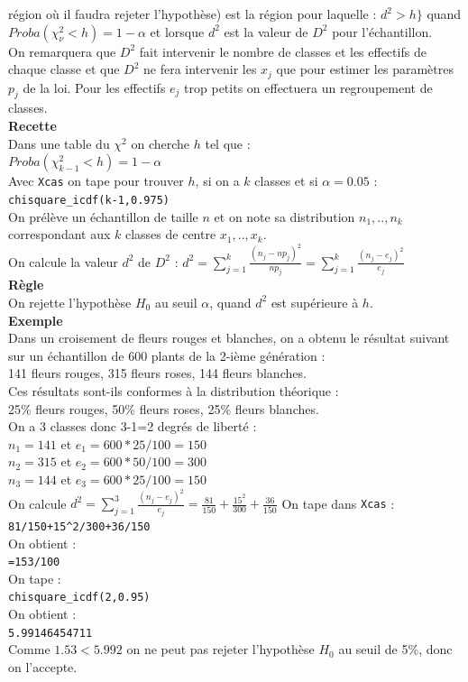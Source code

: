 \documentclass[a4paper,11pt]{book}
\begin{document}
r\'egion o\`u il faudra rejeter l'hypoth\`ese) est la r\'egion pour laquelle :
$d^2>h\}$ quand $Proba(\chi^2_\nu<h)=1-\alpha$ et
lorsque  $d^2$ est la valeur de $D^2$ pour l'\'echantillon.\\
On remarquera que $D^2$ fait  intervenir le nombre de classes et les effectifs 
de chaque classe et que $D^2$ ne fera intervenir les $x_j$ que pour estimer les
param\`etres $p_j$ de la loi. 
Pour les effectifs $e_j$ trop petits on effectuera un regroupement de classes.\\
{\bf Recette}\\
Dans une table du $\chi^2$ on cherche $h$ tel que :\\
$Proba(\chi_{k-1}^2<h)=1-\alpha$\\
Avec {\tt Xcas} on tape pour trouver $h$, si on a $k$ classes et si 
$\alpha=0.05$ :\\
{\tt chisquare\_icdf(k-1,0.975)}\\
On pr\'el\`eve un \'echantillon de taille $n$ et on note sa distribution 
$n_1,..,n_k$ correspondant aux $k$ classes de centre $x_1,..,x_k$.\\
On calcule  la valeur $d^2$ de $ D^2$ :
$\displaystyle d^2=\sum_{j=1}^k\frac{(n_j-np_j)^2}{np_j}=\sum_{j=1}^k\frac{(n_j-e_j)^2}{e_j}$\\
{\bf R\`egle}\\
On rejette l'hypoth\`ese $H_0$ au seuil $\alpha$, quand $d^2$ est sup\'erieure \`a $h$.\\
{\bf Exemple}\\
Dans un croisement de fleurs rouges et blanches, on a obtenu le r\'esultat 
suivant sur un \'echantillon de 600 plants de la 2-i\`eme g\'en\'eration :\\
141 fleurs rouges, 315  fleurs roses, 144 fleurs blanches.\\
Ces r\'esultats sont-ils conformes \`a la distribution th\'eorique :\\
25\% fleurs rouges, 50\%  fleurs roses, 25\% fleurs blanches.\\
On a 3 classes  donc 3-1=2 degr\'es de libert\'e :\\
$n_1=141$ et $e_1=600*25/100=150$\\
$n_2=315$ et $e_2=600*50/100=300$\\
$n_3=144$ et $e_3=600*25/100=150$\\
On calcule $\displaystyle d^2=\sum_{j=1}^3\frac{(n_j-e_j)^2}{e_j}=\frac{81}{150}+\frac{15^2}{300}+\frac{36}{150}$
On tape dans {\tt Xcas} :\\
{\tt 81/150+15\verb|^|2/300+36/150}\\
On obtient :\\
{\tt =153/100}\\
On tape :\\
{\tt chisquare\_icdf(2,0.95)}\\
On obtient :\\
 {\tt 5.99146454711}\\
Comme $1.53<5.992$ on ne peut pas rejeter l'hypoth\`ese $H_0$ au seuil de 5\%,
donc on l'accepte.
\end{document}
